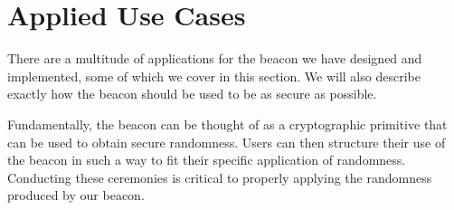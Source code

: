 \section{Applied Use Cases}

There are a multitude of applications for the beacon we have designed and implemented, some of which we cover in this section. We will also describe exactly how the beacon should be used to be as secure as possible.

Fundamentally, the beacon can be thought of as a cryptographic primitive that can be used to obtain secure randomness. Users can then structure their use of the beacon in such a way to fit their specific application of randomness. Conducting these ceremonies is critical to properly applying the randomness produced by our beacon.